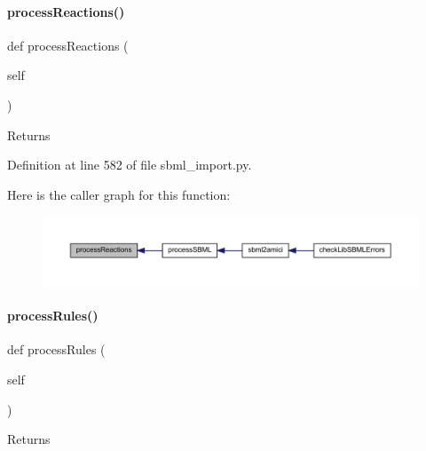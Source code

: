 \paragraph{\texorpdfstring{process\+Reactions()}{processReactions()}}
{\footnotesize\ttfamily def process\+Reactions (\begin{DoxyParamCaption}\item[{}]{self }\end{DoxyParamCaption})}

\begin{DoxyReturn}{Returns}

\end{DoxyReturn}


Definition at line 582 of file sbml\+\_\+import.\+py.

Here is the caller graph for this function\+:
\nopagebreak
\begin{figure}[H]
\begin{center}
\leavevmode
\includegraphics[width=350pt]{classamici_1_1sbml__import_1_1_sbml_importer_adbdd8e9af99679633109829d94b3fd3e_icgraph}
\end{center}
\end{figure}
\mbox{\label{classamici_1_1sbml__import_1_1_sbml_importer_a7df6b4ae4e3e757bc8de5e0cc54fe16b}} 
\paragraph{\texorpdfstring{process\+Rules()}{processRules()}}
{\footnotesize\ttfamily def process\+Rules (\begin{DoxyParamCaption}\item[{}]{self }\end{DoxyParamCaption})}

\begin{DoxyReturn}{Returns}

\end{DoxyReturn}


